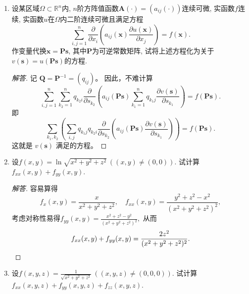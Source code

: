 \begin{3a}
\begin{enumerate}
\begin{proof}[解答]
又有\[\begin{cases}
4\dfrac{\partial u}{\partial w}\dfrac{\partial u}{\partial x}
+4u\dfrac{\partial^2u}{\partial x\partial w}
+6\dfrac{\partial v}{\partial w}\dfrac{\partial v}{\partial x}
+6v\dfrac{\partial^2v}{\partial x\partial w}=0,\\
\dfrac{\partial^2u}{\partial x\partial w}
+\dfrac{\partial^2v}{\partial x\partial w}=0,
\end{cases}\]解得\[\frac{\partial^2u}{\partial x\partial w}
=\frac{1}{3v-2u}\left(2\frac{\partial u}{\partial w}\frac{\partial u}{\partial x}+3\frac{\partial v}{\partial w}\frac{\partial v}{\partial x}\right)
=\frac{6(u-w^3)(2\!\:u-x)+2(3v-2w^3)(3v-x)}{(3v-2u)^3}.\qedhere\]
\end{proof}
\item 设某区域\(\varOmega\subset\mathbb{R}^n\)内, 
\(n\)阶方阵值函数\(\boldsymbol{A}(\cdot)=\left(a_{ij}(\cdot)\right)\)连续可微, 
实函数\(f\)连续, 实函数\(u\)在\(\varOmega\)内二阶连续可微且满足方程
\[\sum_{i,j=1}^{n}\frac{\partial}{\partial x_i}\left(a_{ij}(\boldsymbol{x})\frac{\partial u(\boldsymbol{x})}{\partial x_j}\right)=f(\boldsymbol{x}).\]
作变量代换\(\boldsymbol{x}=\boldsymbol{Ps}\), 其中\(\boldsymbol{P}\)为可逆常数矩阵, 
试将上述方程化为关于\(v(\boldsymbol{s})=u(\boldsymbol{Ps})\)的方程.
\begin{proof}[解答]
记 $\boldsymbol{Q}=\boldsymbol{P}^{-1}=(q_{ij})$。
因此，不难计算
$$\sum_{i,j=1}^n \sum_{k_2=1}^n q_{k_2i} \frac{\partial}{\partial s_{k_2}}\left(a_{ij}(\boldsymbol{Ps}) \sum_{k_1=1}^n q_{k_1j} \frac{\partial v(\boldsymbol{s})}{\partial s_{k_1}}\right)=f(\boldsymbol{Ps}).$$
即
$$\sum_{k_1,k_2}\left(\sum_{i,j} q_{k_1j} q_{k_2i} \frac{\partial}{\partial s_{k_2}}\left(a_{ij}(\boldsymbol{Ps}) \frac{\partial v(\boldsymbol{s})}{\partial s_{k_1}}\right)\right)=f(\boldsymbol{Ps}).$$
这就是 $v(\boldsymbol{s})$ 满足的方程。
\end{proof}
\item 设\(f(x,y)=\ln\sqrt{x^2+y^2+z^2}\ ((x,y)\ne (0,0))\). 试计算\(f_{xx}(x,y)+f_{yy}(x,y)\).
\begin{proof}[解答]
容易算得\[f_x(x,y)=\frac{x}{x^2+y^2+z^2},\quad f_{xx}(x,y)=\frac{y^2+z^2-x^2}{\left(x^2+y^2+z^2\right)^2},\]
考虑对称性易得\(f_{yy}(x,y)=\frac{x^2+z^2-y^2}{\left(x^2+y^2+z^2\right)^2},\) 
从而\[f_{xx}(x,y)+f_{yy}(x,y)=\frac{2z^2}{(x^2+y^2+z^2)^2}.\qedhere\]
\end{proof}
\item 设\(f(x,y,z)=\frac{1}{\sqrt{x^2+y^2+z^2}}\ ((x,y,z)\ne(0,0,0))\). 
试计算\(f_{xx}(x,y,z)+f_{yy}(x,y,z)+f_{zz}(x,y,z)\).

\end{enumerate}
\end{3a}
